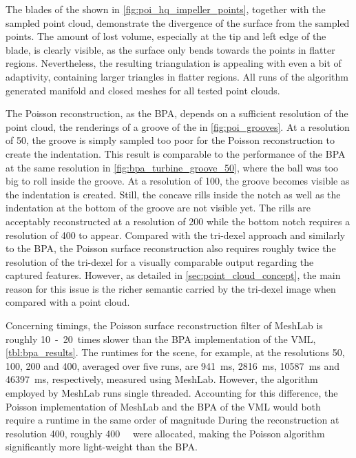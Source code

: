 The blades of the \impeller shown in \cref{fig:poi_hq_impeller_points}, together with the sampled point cloud, demonstrate the divergence of the surface from the sampled points.
The amount of lost volume, especially at the tip and left edge of the blade, is clearly visible, as the surface only bends towards the points in flatter regions.
Nevertheless, the resulting triangulation is appealing with even a bit of adaptivity, containing larger triangles in flatter regions.
All runs of the algorithm generated manifold and closed meshes for all tested point clouds.

The Poisson reconstruction, as the BPA, depends on a sufficient resolution of the point cloud, \cf the renderings of a groove of the \turbine in \cref{fig:poi_grooves}.
At a resolution of 50, the groove is simply sampled too poor for the Poisson reconstruction to create the indentation.
This result is comparable to the performance of the BPA at the same resolution in \cref{fig:bpa_turbine_groove_50}, where the ball was too big to roll inside the groove.
At a resolution of 100, the groove becomes visible as the indentation is created.
Still, the concave rills inside the notch as well as the indentation at the bottom of the groove are not visible yet.
The rills are acceptably reconstructed at a resolution of 200 while the bottom notch requires a resolution of 400 to appear.
Compared with the tri-dexel approach and similarly to the BPA, the Poisson surface reconstruction also requires roughly twice the resolution of the tri-dexel for a visually comparable output regarding the captured features.
However, as detailed in \cref{sec:point_cloud_concept}, the main reason for this issue is the richer semantic carried by the tri-dexel image when compared with a point cloud.

Concerning timings, the Poisson surface reconstruction filter of MeshLab is roughly 10~-~20~times slower than the BPA implementation of the VML, \cf \cref{tbl:bpa_results}.
The runtimes for the \turbine scene, for example, at the resolutions 50, 100, 200 and 400, averaged over five runs, are \SI{941}{\milli\second}, \SI{2816}{\milli\second}, \SI{10587}{\milli\second} and \SI{46397}{\milli\second}, respectively, measured using MeshLab.
However, the algorithm employed by MeshLab runs single threaded.
Accounting for this difference, the Poisson implementation of MeshLab and the BPA of the VML would both require a runtime in the same order of magnitude
During the reconstruction at resolution 400, roughly \SI{400}{\mebi\byte} were allocated, making the Poisson algorithm significantly more light-weight than the BPA.

